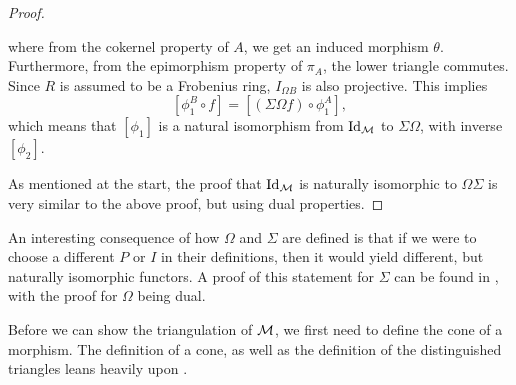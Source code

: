 \begin{proof}
\begin{center}
    \end{center}
    where from the cokernel property of \( A \), we get an induced morphism \( \theta \). Furthermore, from the epimorphism property of \( \pi_A \), the lower triangle commutes. Since \( R \) is assumed to be a Frobenius ring, \( I_{\Omega B} \) is also projective. This implies
    \[
        [\phi_1^B \circ f] = [(\Sigma \Omega f) \circ \phi_1^A],
    \]
    which means that \( [\phi_1] \) is a natural isomorphism from \( \operatorname{Id}_{{\mathcal{M}}} \) to \( \Sigma \Omega \), with inverse \( [\phi_2] \).

    As mentioned at the start, the proof that \( \operatorname{Id}_{{\mathcal{M}}} \) is naturally isomorphic to \( \Omega \Sigma \) is very similar to the above proof, but using dual properties.
\end{proof}

An interesting consequence of how \( \Omega \) and \( \Sigma \) are defined is that if we were to choose a different \( P \) or \( I \) in their definitions, then it would yield different, but naturally isomorphic functors. A proof of this statement for \( \Sigma \) can be found in \cite[p.\ 13]{Happel_1988}, with the proof for \( \Omega \) being dual.

Before we can show the triangulation of \( {\mathcal{M}} \), we first need to define the cone of a morphism. The definition of a cone, as well as the definition of the distinguished triangles leans heavily upon \cite[Section 1.2.5]{Happel_1988}.

